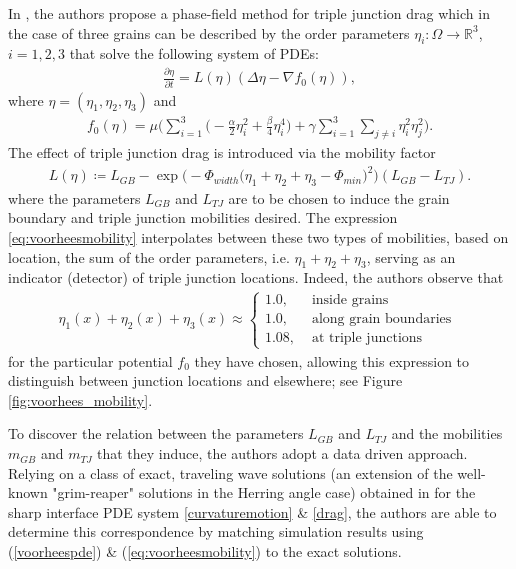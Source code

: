\documentclass{article}
\theoremstyle{plain}
\theoremstyle{definition}
\theoremstyle{remark}
\newcommand{\R}{\mathbb{R}}
\begin{document}
In \cite{johnsonvoorhees}, the authors propose a phase-field method for triple junction drag which in the case of three grains can be described by the order parameters $\eta_i:\Omega \to \R^3$, $i=1,2,3$ that solve the following system of PDEs:
\begin{align}\label{voorheespde}
    \frac{\partial \eta}{\partial t} = L(\eta)(\Delta \eta - \nabla f_0(\eta)),
\end{align}
where $\eta = (\eta_1,\eta_2,\eta_3)$ and
\begin{align}
    f_0(\eta) = \mu\bigg(\sum_{i=1}^3 \big( -\frac{\alpha}{2}\eta_i^2 + \frac{\beta}{4}\eta_i^4\big) + \gamma\sum_{i=1}^3 \sum_{j\neq i}\eta_i^2 \eta_j^2  \bigg).
\end{align}
The effect of triple junction drag is introduced via the mobility factor 
\begin{align}
\label{eq:voorheesmobility}
    L(\eta) \coloneqq L_{GB} - \exp\bigg(-\Phi_{width}\big(\eta_1+\eta_2+\eta_3 - \Phi_{min}\big)^2\bigg)(L_{GB} - L_{TJ}).
\end{align}
where the parameters $L_{GB}$ and $L_{TJ}$ are to be chosen to induce the grain boundary and triple junction mobilities desired.
The expression \eqref{eq:voorheesmobility} interpolates between these two types of mobilities, based on location, 
the sum of the order parameters, i.e. $\eta_1 + \eta_2 + \eta_3$, serving as an indicator (detector) of triple junction locations.
Indeed, the authors observe that
\begin{align*}
    \eta_1(x) + \eta_2(x) + \eta_3(x) \approx
    \begin{cases}
        1.0, &\text{ inside grains }\\
        1.0, &\text{ along grain boundaries }\\
        1.08, &\text{ at triple junctions}
    \end{cases}
\end{align*}
for the particular potential $f_0$ they have chosen, allowing this expression to distinguish between junction locations and elsewhere; see Figure \ref{fig:voorhees_mobility}.

To discover the relation between the parameters $L_{GB}$ and $L_{TJ}$ and the mobilities $m_{GB}$ and $m_{TJ}$ that they induce, the authors adopt a data driven approach.
Relying on a class of exact, traveling wave solutions (an extension of the well-known "grim-reaper" solutions in the Herring angle case) obtained in \cite{GOTTSTEIN2002703} for the sharp interface PDE system \eqref{curvaturemotion} \& \eqref{drag}, the authors are able to determine this correspondence by matching simulation results using (\ref{voorheespde}) \& (\ref{eq:voorheesmobility}) to the exact solutions.
\end{document}
